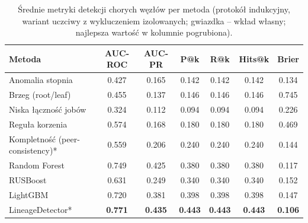 \begin{table}[ht]
\centering
\caption{Średnie metryki detekcji chorych węzłów per metoda (protokół indukcyjny, wariant uczciwy z wykluczeniem izolowanych; gwiazdka -- wkład własny; najlepsza wartość w kolumnie pogrubiona).}
\label{tab:wyniki-detekcja}
\begin{tabular}{lcccccc}
\toprule
\textbf{Metoda} & \textbf{AUC-ROC} & \textbf{AUC-PR} & \textbf{P@k} & \textbf{R@k} & \textbf{Hits@k} & \textbf{Brier} \\
\midrule
Anomalia stopnia & 0.427 & 0.165 & 0.142 & 0.142 & 0.142 & 0.134 \\
Brzeg (root/leaf) & 0.455 & 0.137 & 0.146 & 0.146 & 0.146 & 0.745 \\
Niska łączność jobów & 0.324 & 0.112 & 0.094 & 0.094 & 0.094 & 0.226 \\
Reguła korzenia & 0.574 & 0.168 & 0.180 & 0.180 & 0.180 & 0.469 \\
Kompletność (peer-consistency)* & 0.559 & 0.206 & 0.240 & 0.240 & 0.240 & 0.144 \\
\midrule
Random Forest & 0.749 & 0.425 & 0.380 & 0.380 & 0.380 & 0.117 \\
RUSBoost & 0.631 & 0.249 & 0.340 & 0.340 & 0.340 & 0.152 \\
LightGBM & 0.720 & 0.381 & 0.398 & 0.398 & 0.398 & 0.147 \\
\midrule
LineageDetector* & \textbf{0.771} & \textbf{0.435} & \textbf{0.443} & \textbf{0.443} & \textbf{0.443} & \textbf{0.106} \\
\bottomrule
\end{tabular}
\end{table}
